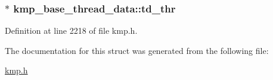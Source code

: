 \hypertarget{structkmp__base__thread__data_accbff1b277142a1dfa82c660147acdfe}{
\subsubsection[{td\-\_\-thr}]{$\ast$ kmp\-\_\-base\-\_\-thread\-\_\-data\-::td\-\_\-thr}}\label{structkmp__base__thread__data_accbff1b277142a1dfa82c660147acdfe}


Definition at line 2218 of file kmp.\-h.



The documentation for this struct was generated from the following file\-:\begin{DoxyCompactItemize}
\item 
\hyperlink{kmp_8h}{kmp.\-h}\end{DoxyCompactItemize}
